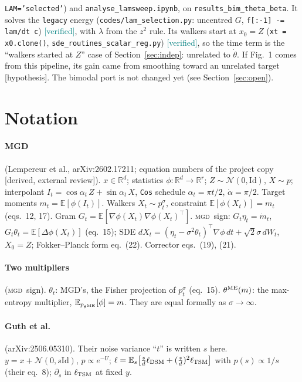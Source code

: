 \documentclass[11pt,a4paper]{article}
\newcommand{\code}[1]{\texttt{#1}}
\newcommand{\ver}{\textcolor{teal}{\textsf{[verified]}}}
\newcommand{\hyp}{\textcolor{orange!80!black}{\textsf{[hypothesis]}}}
\newcommand{\ext}{\textcolor{purple!80!black}{\textsf{[derived, external review]}}}
\newcommand{\E}{\mathbb{E}}
\newcommand{\R}{\mathbb{R}}
\newcommand{\Id}{\mathrm{Id}}
\newcommand{\MGD}{\textsc{mgd}}
\begin{document}
\begin{description}[leftmargin=1.2em,style=nextline]
  \code{LAM='selected'}) and \code{analyse\_lamsweep.ipynb}, on \code{results\_bim\_theta\_beta}. It solves the \code{legacy} energy
  (\code{codes/lam\_selection.py}: uncentred $G$, \code{f[:-1] -= lam/dt c}) \ver, with $\lambda$ from the $z^2$ rule. Its walkers start at
  $x_0=Z$ (\code{xt = x0.clone()}, \code{sde\_routines\_scalar\_reg.py}) \ver, so the time term is the ``walkers started at $Z$'' case of
  Section~\ref{sec:indep}: unrelated to $\dot\theta$. If Fig.~1 comes from this pipeline, its gain came from smoothing toward an unrelated target \hyp.
  The bimodal port is not changed yet (see Section~\ref{sec:open}).
\end{description}

\section{Notation}
\paragraph{MGD} (Lempereur et al., arXiv:2602.17211; equation numbers of the project copy \ext).
$x\in\R^d$; statistics $\phi:\R^d\to\R^r$; $Z\sim\mathcal N(0,\Id)$, $X\sim p$; interpolant $I_t=\cos\alpha_t\,Z+\sin\alpha_t\,X$,
\code{Cos} schedule $\alpha_t=\pi t/2$, $\dot\alpha=\pi/2$. Target moments $m_t=\E[\phi(I_t)]$. Walkers $X_t\sim p^\sigma_t$, constraint
$\E[\phi(X_t)]=m_t$ (eqs.~12, 17). Gram $G_t=\E[\nabla\phi(X_t)\nabla\phi(X_t)^\top]$.
\MGD\ sign: $G_t\eta_t=\dot m_t$, $G_t\theta_t=\E[\Delta\phi(X_t)]$ (eq.~15); SDE $dX_t=(\eta_t-\sigma^2\theta_t)^\top\nabla\phi\,dt+\sqrt2\sigma\,dW_t$,
$X_0=Z$; Fokker--Planck form eq.~(22). Corrector eqs.~(19), (21).
\paragraph{Two multipliers} (\MGD\ sign). $\theta_t$: MGD's, the Fisher projection of $p^\sigma_t$ (eq.~15). $\theta^{\rm ME}(m)$: the max-entropy
multiplier, $\E_{p_{\theta^{\rm ME}}}[\phi]=m$. They are equal formally as $\sigma\to\infty$.
\paragraph{Guth et al.} (arXiv:2506.05310). Their noise variance ``$t$'' is written $s$ here. $y=x+\mathcal N(0,s\Id)$, $p\propto e^{-U}$;
$\ell=\E_{s}\big[\frac sd\ell_{\rm DSM}+(\frac sd)^2\ell_{\rm TSM}\big]$ with $p(s)\propto1/s$ (their eq.~8); $\partial_s$ in $\ell_{\rm TSM}$ at fixed $y$.
\end{document}
